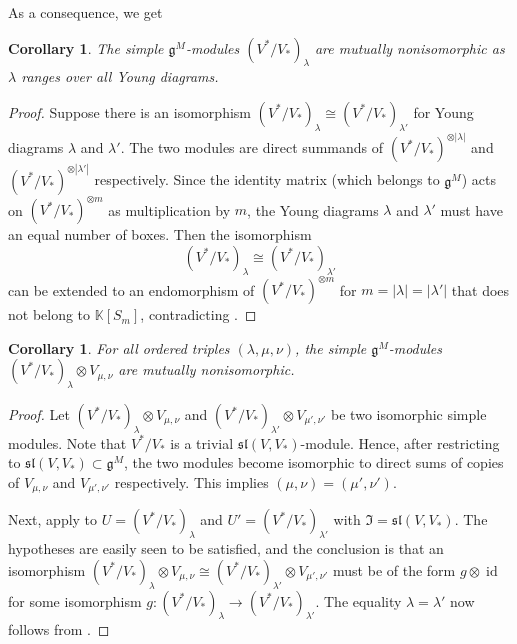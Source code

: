 \documentclass[11pt]{article}
\theoremstyle{plain}
\newtheorem{corollary}[lemma]{Corollary}
\theoremstyle{nonumberplain}
\theoremstyle{plain}
\theoremstyle{nonumberplain}
\newtheorem{proof}{Proof}
\newcommand\bK{{\mathbb K}}
\newcommand\fg{\mathfrak{g}}
\newcommand\fsl{\mathfrak{sl}}
\DeclareMathOperator{\id}{id}
\begin{document}
As a consequence, we get


\begin{corollary}\label{cor.S-W}
  The simple $\fg^M$-modules $(V^*/V_*)_\lambda$ are mutually nonisomorphic as $\lambda$ ranges over all Young diagrams. 
\end{corollary}
\begin{proof}
  Suppose there is an isomorphism $(V^*/V_*)_\lambda\cong (V^*/V_*)_{\lambda'}$ for Young diagrams $\lambda$ and $\lambda'$. The two modules are direct summands of $(V^*/V_*)^{\otimes|\lambda|}$ and $(V^*/V_*)^{\otimes|\lambda'|}$ respectively. Since the identity matrix (which belongs to $\fg^M$) acts on $(V^*/V_*)^{\otimes m}$ as multiplication by $m$, the Young diagrams $\lambda$ and $\lambda'$ must have an equal number of boxes. Then the isomorphism 
  \begin{equation*}
    (V^*/V_*)_\lambda \cong     (V^*/V_*)_{\lambda'}
  \end{equation*}
can be extended to an endomorphism of $(V^*/V_*)^{\otimes m}$ for $m=|\lambda|=|\lambda'|$ that does not belong to $\bK\left[S_m\right]$, contradicting . 
\end{proof}




\begin{corollary}\label{cor.dist_simples}
  For all ordered triples $(\lambda,\mu,\nu)$, the simple $\fg^M$-modules $ (V^*/V_*)_\lambda\otimes V_{\mu,\nu}$ are mutually nonisomorphic.
\end{corollary}
\begin{proof}
 Let $ (V^*/V_*)_\lambda\otimes V_{\mu,\nu}$ and $ (V^*/V_*)_{\lambda'}\otimes V_{\mu',\nu'}$ be two isomorphic simple modules.  Note that $V^*/V_*$ is a trivial $\fsl\left(V,V_*\right)$-module.  Hence, after restricting to $\fsl\left(V,V_*\right)\subset \fg^M$, the two modules become isomorphic to direct sums of copies of $V_{\mu,\nu}$ and $V_{\mu',\nu'}$ respectively. This implies $(\mu,\nu)=(\mu',\nu')$.

Next, apply  to $U=(V^*/V_*)_\lambda$ and $U'=(V^*/V_*)_{\lambda'}$ with $\mathfrak{I}=\fsl\left(V,V_*\right)$. The hypotheses are easily seen to be satisfied, and the conclusion is that an isomorphism $ (V^*/V_*)_\lambda\otimes V_{\mu,\nu} \cong (V^*/V_*)_{\lambda'}\otimes V_{\mu',\nu'}$ must be of the form $g\otimes \id$ for some isomorphism $g:(V^*/V_*)_{\lambda}\to (V^*/V_*)_{\lambda'}$. The equality $\lambda=\lambda'$ now follows from .
\end{proof}
\end{document}
